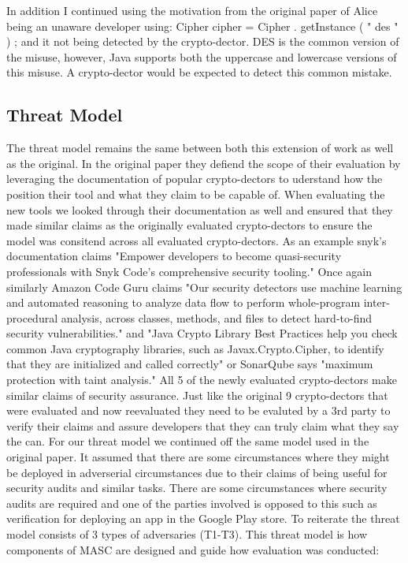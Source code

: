 In addition I continued using the motivation from the original paper of Alice being an unaware developer using:
Cipher cipher = Cipher . getInstance ( " des " ) ;
and it not being detected by the crypto-dector. DES is the common version of the misuse, however, Java supports both the uppercase and lowercase versions of this misuse. A crypto-dector would be expected to detect this common mistake.

\subsection{Threat Model}
\label{ch1:subsec:ThreatModel}

The threat model remains the same between both this extension of work as well as the original. In the original paper they defiend the scope of their evaluation by leveraging the documentation of popular crypto-dectors to uderstand how the position their tool and what they claim to be capable of. When evaluating the new tools we looked through their documentation as well and ensured that they made similar claims as the originally evaluated crypto-dectors to ensure the model was consitend across all evaluated crypto-dectors. As an example snyk's documentation claims "Empower developers to become quasi-security professionals with Snyk Code’s comprehensive security tooling." Once again similarly Amazon Code Guru claims "Our security detectors use machine learning and automated reasoning to analyze data flow to perform whole-program inter-procedural analysis, across classes, methods, and files to detect hard-to-find security vulnerabilities." and "Java Crypto Library Best Practices help you check common Java cryptography libraries, such as Javax.Crypto.Cipher, to identify that they are initialized and called correctly" or SonarQube says "maximum protection with taint analysis." All 5 of the newly evaluated crypto-dectors make similar claims of security assurance. Just like the original 9 crypto-dectors that were evaluated and now reevaluated they need to be evaluted by a 3rd party to verify their claims and assure developers that they can truly claim what they say the can.
For our threat model we continued off the same model used in the original paper. It assumed that there are some circumstances where they might be deployed in adverserial circumstances due to their claims of being useful for security audits and similar tasks. There are some circumstances where security audits are required and one of the parties involved is opposed to this such as verification for deploying an app in the Google Play store. To reiterate the threat model consists of 3 types of adversaries (T1-T3). This threat model is how components of MASC are designed and guide how evaluation was conducted:
